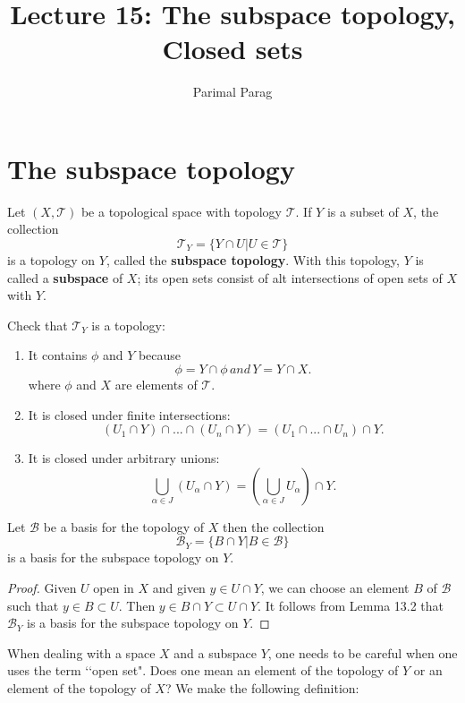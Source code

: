 \documentclass[a4paper,english,12pt]{article}
\title{Lecture 15: The subspace topology, Closed sets}
\author{Parimal Parag}
\begin{document}
\maketitle

\section{The subspace topology}
\begin{defn}
	Let $(X,\mathcal{T})$ be a topological space with topology $\mathcal{T}$. If $Y$ is a subset of $X$, the collection 
	\[ \mathcal{T}_Y = \{Y \cap U | U \in \mathcal{T}\}	\]
	is a topology on $Y$, called the \textbf{subspace topology}. With this topology, $Y$ is called a \textbf{subspace} of $X$; its open sets consist of alt intersections of open sets of $X$ with $Y$.
\end{defn}
Check that $\mathcal{T}_Y$ is a topology: 
\begin{enumerate}
	\item It contains $\phi$ and $Y$ because 
	\[  \phi = Y \cap \phi \, and \, Y = Y \cap X.\]
	where $\phi$ and $X$ are elements of $\mathcal{T}$.	
	\item It is closed under finite intersections:
	\[ (U_1 \cap Y) \cap ... \cap (U_n \cap Y) = (U_1 \cap ... \cap U_n) \cap Y. \]	
	\item It is closed under arbitrary unions:
	\[ \bigcup_{\alpha \in J} (U_\alpha \cap Y) = (\bigcup_{\alpha \in J}U_\alpha) \cap Y.\]
\end{enumerate}

\begin{lem}
	Let $\mathcal{B}$ be a basis for the topology of $X$ then the collection
	\[ \mathcal{B}_Y = \{B \cap Y | B \in \mathcal{B\}} \]
	is a basis for the subspace topology on $Y$.
\end{lem}

\begin{proof}
	Given $U$ open in $X$ and given $y \in U \cap Y$, we can choose an element $B$ of $\mathcal{B}$ such that $y \in B \subset U$. Then $y \in B \cap Y \subset U \cap Y$. It follows from Lemma 13.2 that $\mathcal{B}_Y$ is a basis for the subspace topology on $Y$.
\end{proof}

When dealing with a space $X$ and a subspace $Y$, one needs to be careful when
one uses the term \lq \lq open set". Does one mean an element of the topology of $Y$ or an element of the topology of $X$? We make the following definition:
\end{document}
